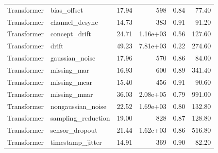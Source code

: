 \begin{table}
\begin{tabular}{llrrrr}
Transformer & bias\_offset & 17.94 & 598 & 0.84 & 77.40 \\
Transformer & channel\_desync & 14.73 & 383 & 0.91 & 91.20 \\
Transformer & concept\_drift & 24.71 & 1.16e+03 & 0.56 & 127.60 \\
Transformer & drift & 49.23 & 7.81e+03 & 0.22 & 274.60 \\
Transformer & gaussian\_noise & 17.96 & 570 & 0.86 & 84.00 \\
Transformer & missing\_mar & 16.93 & 600 & 0.89 & 341.40 \\
Transformer & missing\_mcar & 15.40 & 456 & 0.91 & 90.60 \\
Transformer & missing\_mnar & 36.03 & 2.08e+05 & 0.79 & 991.00 \\
Transformer & nongaussian\_noise & 22.52 & 1.69e+03 & 0.80 & 132.80 \\
Transformer & sampling\_reduction & 19.00 & 828 & 0.87 & 128.80 \\
Transformer & sensor\_dropout & 21.44 & 1.62e+03 & 0.86 & 516.80 \\
Transformer & timestamp\_jitter & 14.91 & 369 & 0.90 & 82.20 \\
\bottomrule
\end{tabular}
\end{table}
